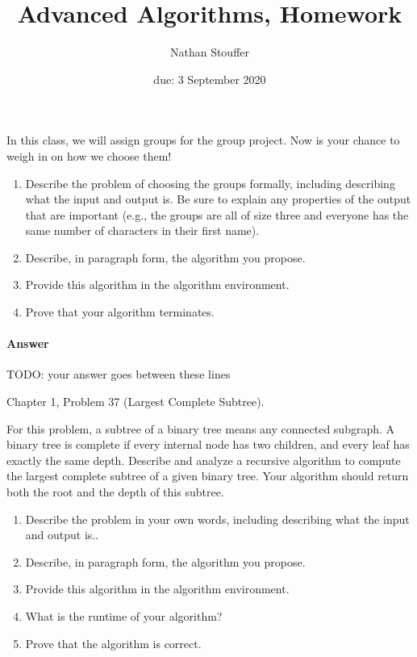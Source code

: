 \documentclass{article}
\title{Advanced Algorithms, Homework \hwnum}
\author{Nathan Stouffer}
\date{due: 3 September 2020}
\begin{document}
\maketitle

\nextprob
{}

In this class, we will assign groups for the group project.  Now is your chance
to weigh in on how we choose them!
\begin{enumerate}
    \item Describe the problem of choosing the groups formally, including
        describing what the input and output is.  Be sure to explain any
        properties of the output that are important (e.g., the groups are all of
        size three and everyone has the same number of characters in their first
        name).
    \item Describe, in paragraph form, the algorithm you propose.
    \item Provide this algorithm in the algorithm environment.
    \item Prove that your algorithm terminates.
\end{enumerate}

\paragraph{Answer}


TODO: your answer goes between these lines


\nextprob
{}

Chapter 1, Problem 37 (Largest Complete Subtree).

For this problem, a subtree of a binary tree means any connected subgraph.
A binary tree is complete if every internal node has two children, and every leaf has exactly the same depth.
Describe and analyze a recursive algorithm to compute the largest complete subtree of a given binary tree.
Your algorithm should return both the root and the depth of this subtree.


\begin{enumerate}
    \item Describe the problem in your own words, including
        describing what the input and output is..
    \item Describe, in paragraph form, the algorithm you propose.
    \item Provide this algorithm in the algorithm environment.
    \item What is the runtime of your algorithm?
    \item Prove that the algorithm is correct.
\end{enumerate}
\end{document}
